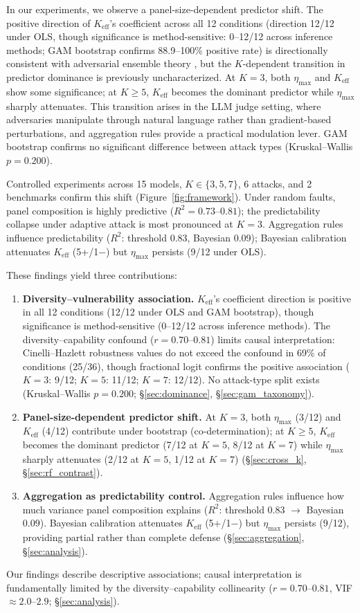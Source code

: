 In our experiments, we observe a panel-size-dependent predictor shift. The positive direction of $K_{\mathrm{eff}}$'s coefficient across all 12 conditions (direction 12/12 under OLS, though significance is method-sensitive: 0--12/12 across inference methods; GAM bootstrap confirms 88.9--100\% positive rate) is directionally consistent with adversarial ensemble theory \citep{goodfellow2015adversarial,papernot2016transferability}, but the $K$-dependent transition in predictor dominance is previously uncharacterized. At $K{=}3$, both $\eta_{\max}$ and $K_{\mathrm{eff}}$ show some significance; at $K{\geq}5$, $K_{\mathrm{eff}}$ becomes the dominant predictor while $\eta_{\max}$ sharply attenuates. This transition arises in the LLM judge setting, where adversaries manipulate through natural language rather than gradient-based perturbations, and aggregation rules provide a practical modulation lever. GAM bootstrap confirms no significant difference between attack types (Kruskal--Wallis $p{=}0.200$).

Controlled experiments across 15 models, $K \in \{3,5,7\}$, 6 attacks, and 2 benchmarks confirm this shift (Figure~\ref{fig:framework}). Under random faults, panel composition is highly predictive ($R^2 = 0.73$--$0.81$); the predictability collapse under adaptive attack is most pronounced at $K{=}3$. Aggregation rules influence predictability ($R^2$: threshold 0.83, Bayesian 0.09); Bayesian calibration attenuates $K_{\mathrm{eff}}$ (5+/1$-$) but $\eta_{\max}$ persists (9/12 under OLS).

These findings yield three contributions:
\begin{enumerate}
\item \textbf{Diversity--vulnerability association.} $K_{\mathrm{eff}}$'s coefficient direction is positive in all 12 conditions (12/12 under OLS and GAM bootstrap), though significance is method-sensitive (0--12/12 across inference methods). The diversity--capability confound ($r{=}0.70$--$0.81$) limits causal interpretation: Cinelli--Hazlett robustness values do not exceed the confound in 69\% of conditions (25/36), though fractional logit confirms the positive association ($K{=}3$: 9/12; $K{=}5$: 11/12; $K{=}7$: 12/12). No attack-type split exists (Kruskal--Wallis $p{=}0.200$; \S\ref{sec:dominance}, \S\ref{sec:gam_taxonomy}).
\item \textbf{Panel-size-dependent predictor shift.} At $K{=}3$, both $\eta_{\max}$ (3/12) and $K_{\mathrm{eff}}$ (4/12) contribute under bootstrap (co-determination); at $K{\geq}5$, $K_{\mathrm{eff}}$ becomes the dominant predictor (7/12 at $K{=}5$, 8/12 at $K{=}7$) while $\eta_{\max}$ sharply attenuates (2/12 at $K{=}5$, 1/12 at $K{=}7$) (\S\ref{sec:cross_k}, \S\ref{sec:rf_contrast}).
\item \textbf{Aggregation as predictability control.} Aggregation rules influence how much variance panel composition explains ($R^2$: threshold 0.83 $\to$ Bayesian 0.09). Bayesian calibration attenuates $K_{\mathrm{eff}}$ (5+/1$-$) but $\eta_{\max}$ persists (9/12), providing partial rather than complete defense (\S\ref{sec:aggregation}, \S\ref{sec:analysis}).
\end{enumerate}

Our findings describe descriptive associations; causal interpretation is fundamentally limited by the diversity--capability collinearity ($r{=}0.70$--$0.81$, VIF${\approx}2.0$--$2.9$; \S\ref{sec:analysis}).
